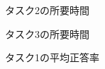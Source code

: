 \documentclass[syuuron]{kuee}
\begin{document}
		\begin{figure}
			\begin{center}
			\end{center}
			\caption{タスク2の所要時間}
	  		\label{fig:res2}
		\end{figure}
		\begin{figure}
			\begin{center}
			\end{center}
			\caption{タスク3の所要時間}
	  		\label{fig:res3}
		\end{figure}
		\begin{figure}
			\begin{center}
			\end{center}
			\caption{タスク1の平均正答率}
	  		\label{fig:res4}
		\end{figure}
\end{document}
